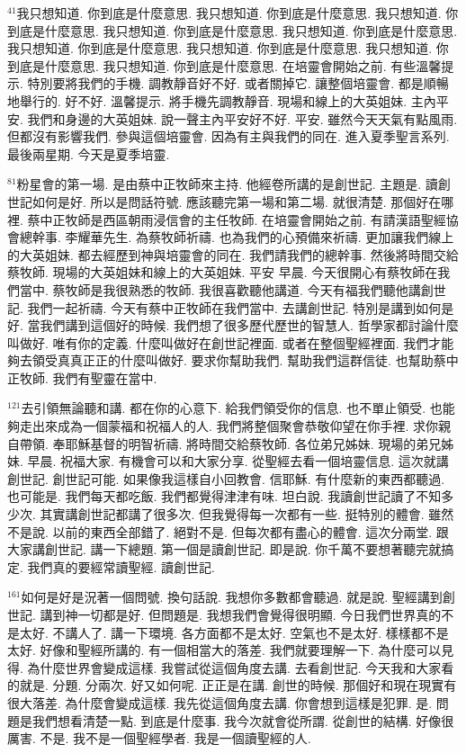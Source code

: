 \documentclass{book}
\begin{document}
$^{41}$我只想知道.
你到底是什麼意思.
我只想知道.
你到底是什麼意思.
我只想知道.
你到底是什麼意思.
我只想知道.
你到底是什麼意思.
我只想知道.
你到底是什麼意思.
我只想知道.
你到底是什麼意思.
我只想知道.
你到底是什麼意思.
我只想知道.
你到底是什麼意思.
我只想知道.
你到底是什麼意思.
在培靈會開始之前.
有些溫馨提示.
特別要將我們的手機.
調教靜音好不好.
或者關掉它.
讓整個培靈會.
都是順暢地舉行的.
好不好.
溫馨提示.
將手機先調教靜音.
現場和線上的大英姐妹.
主內平安.
我們和身邊的大英姐妹.
說一聲主內平安好不好.
平安.
雖然今天天氣有點風雨.
但都沒有影響我們.
參與這個培靈會.
因為有主與我們的同在.
進入夏季聖言系列.
最後兩星期.
今天是夏季培靈.

$^{81}$粉星會的第一場.
是由蔡中正牧師來主持.
他經卷所講的是創世記.
主題是.
讀創世記如何是好.
所以是問話符號.
應該聽完第一場和第二場.
就很清楚.
那個好在哪裡.
蔡中正牧師是西區朝雨浸信會的主任牧師.
在培靈會開始之前.
有請漢語聖經協會總幹事.
李耀華先生.
為蔡牧師祈禱.
也為我們的心預備來祈禱.
更加讓我們線上的大英姐妹.
都去經歷到神與培靈會的同在.
我們請我們的總幹事.
然後將時間交給蔡牧師.
現場的大英姐妹和線上的大英姐妹.
平安 早晨.
今天很開心有蔡牧師在我們當中.
蔡牧師是我很熟悉的牧師.
我很喜歡聽他講道.
今天有福我們聽他講創世記.
我們一起祈禱.
今天有蔡中正牧師在我們當中.
去講創世記.
特別是講到如何是好.
當我們講到這個好的時候.
我們想了很多歷代歷世的智慧人.
哲學家都討論什麼叫做好.
唯有你的定義.
什麼叫做好在創世記裡面.
或者在整個聖經裡面.
我們才能夠去領受真真正正的什麼叫做好.
要求你幫助我們.
幫助我們這群信徒.
也幫助蔡中正牧師.
我們有聖靈在當中.

$^{121}$去引領無論聽和講.
都在你的心意下.
給我們領受你的信息.
也不單止領受.
也能夠走出來成為一個蒙福和祝福人的人.
我們將整個聚會恭敬仰望在你手裡.
求你親自帶領.
奉耶穌基督的明智祈禱.
將時間交給蔡牧師.
各位弟兄姊妹.
現場的弟兄姊妹.
早晨.
祝福大家.
有機會可以和大家分享.
從聖經去看一個培靈信息.
這次就講創世記.
創世記可能.
如果像我這樣自小回教會.
信耶穌.
有什麼新的東西都聽過.
也可能是.
我們每天都吃飯.
我們都覺得津津有味.
坦白說.
我讀創世記讀了不知多少次.
其實講創世記都講了很多次.
但我覺得每一次都有一些.
挺特別的體會.
雖然不是說.
以前的東西全部錯了.
絕對不是.
但每次都有盡心的體會.
這次分兩堂.
跟大家講創世記.
講一下總題.
第一個是讀創世記.
即是說.
你千萬不要想著聽完就搞定.
我們真的要經常讀聖經.
讀創世記.

$^{161}$如何是好是況著一個問號.
換句話說.
我想你多數都會聽過.
就是說.
聖經講到創世記.
講到神一切都是好.
但問題是.
我想我們會覺得很明顯.
今日我們世界真的不是太好.
不講人了.
講一下環境.
各方面都不是太好.
空氣也不是太好.
樣樣都不是太好.
好像和聖經所講的.
有一個相當大的落差.
我們就要理解一下.
為什麼可以見得.
為什麼世界會變成這樣.
我嘗試從這個角度去講.
去看創世記.
今天我和大家看的就是.
分題.
分兩次.
好又如何呢.
正正是在講.
創世的時候.
那個好和現在現實有很大落差.
為什麼會變成這樣.
我先從這個角度去講.
你會想到這樣是犯罪.
是.
問題是我們想看清楚一點.
到底是什麼事.
我今次就會從所謂.
從創世的結構.
好像很厲害.
不是.
我不是一個聖經學者.
我是一個讀聖經的人.
\end{document}
